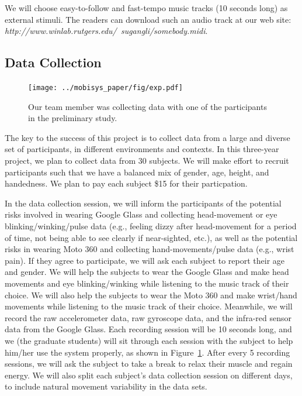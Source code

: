 We will choose easy-to-follow and fast-tempo music tracks (10 seconds long) as external stimuli. The readers can download such an audio track at our web site: \emph{http://www.winlab.rutgers.edu/~sugangli/somebody.midi}.

\subsection{Data Collection}\label{subsec:user}
\begin{figure}\centering
\texttt{[image: ../mobisys\_paper/fig/exp.pdf]}
\caption{Our team member was collecting data with one of the participants in the preliminary study. \label{fig:exp}}
\end{figure}

The key to the success of this project is to collect data from a large and diverse set of participants, in different environments and contexts.  In this three-year project, we plan to collect data from 30 subjects. We will make effort to recruit participants such that we have a balanced mix of gender, age, height, and handedness. We plan to pay each subject \$15 for their particpation.

In the data collection session, we will inform the participants of the potential risks involved in wearing Google Glass and collecting head-movement or eye blinking/winking/pulse data (e.g., feeling dizzy after head-movement for a period of time, not being able to see clearly if near-sighted, etc.), as well as the potential risks in wearing Moto 360 and collecting hand-movements/pulse data (e.g., wrist pain). If they agree to participate, we will ask each subject to report their age and gender. We will help the subjects to wear the Google Glass and make head movements and eye blinking/winking while listening to the music track of their choice. We will also help the subjects to wear the Moto 360 and make wrist/hand movements while listening to the music track of their choice. Meanwhile, we will record the raw accelerometer data, raw gyroscope data, and the infra-red sensor data from the Google Glass.  Each recording session will be 10 seconds long, and we (the graduate students) will sit through each session with the subject to help him/her use the system properly, as shown in Figure~\ref{fig:exp}. After every 5 recording sessions, we will ask the subject to take a break to relax their muscle and regain energy. We will also split each subject's data collection session on different days, to include natural movement variability in the data sets. 


